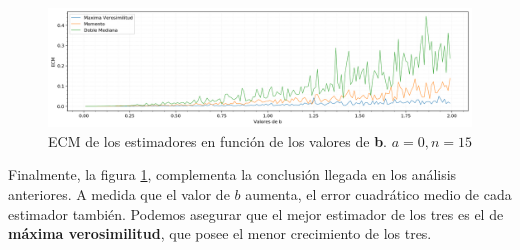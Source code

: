 \begin{figure}[H]
	\centering
	\includegraphics[width=1\textwidth]{imagenes/ecm.png}
	\caption{\footnotesize ECM de los estimadores en función de los valores de \textbf{b}. $a=0, n=15$}
	\label{fig:ej6-ecm}
\end{figure}

Finalmente, la figura \ref{fig:ej6-ecm}, complementa la conclusión llegada en los análisis anteriores. A medida que el valor de $b$ aumenta, el error cuadrático medio de cada estimador también. Podemos asegurar que el mejor estimador de los tres es el de \textbf{máxima verosimilitud}, que posee el menor crecimiento de los tres.